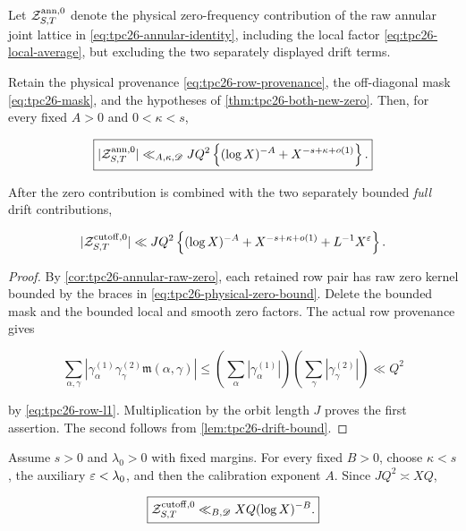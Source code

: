 Let \(\mathcal Z^{\rm ann,0}_{S,T}\) denote the physical zero-frequency
contribution of the raw annular joint lattice in
\eqref{eq:tpc26-annular-identity}, including the local factor
\eqref{eq:tpc26-local-average}, but excluding the two separately
displayed drift terms.

\begin{theorem}
\label{thm:tpc26-physical-zero}
Retain the physical provenance
\eqref{eq:tpc26-row-provenance}, the off-diagonal mask
\eqref{eq:tpc26-mask}, and the hypotheses of
\cref{thm:tpc26-both-new-zero}.  Then, for every fixed \(A>0\) and
\(0<\kappa<s\),

\begin{equation}
 \boxed{
 |\mathcal Z^{\rm ann,0}_{S,T}|
 \ll_{A,\kappa,\mathscr D}
 JQ^2\left\{
 (\log X)^{-A}+X^{-s+\kappa+o(1)}
 \right\}.}
 \label{eq:tpc26-physical-zero-bound}
\end{equation}

After the zero contribution is combined with the two separately
bounded \emph{full} drift contributions,

\begin{equation}
 |\mathcal Z^{\rm cutoff,0}_{S,T}|
 \ll
 JQ^2\left\{
 (\log X)^{-A}+X^{-s+\kappa+o(1)}
 +L^{-1}X^\varepsilon
 \right\}.
 \label{eq:tpc26-full-zero-bound}
\end{equation}
\end{theorem}

\begin{proof}
By \cref{cor:tpc26-annular-raw-zero}, each retained row pair has raw
zero kernel bounded by the braces in
\eqref{eq:tpc26-physical-zero-bound}.  Delete the bounded mask and the
bounded local and smooth zero factors.  The actual row provenance gives

\[
 \sum_{\alpha,\gamma}
 |\gamma_\alpha^{(1)}\gamma_\gamma^{(2)}
 \mathfrak m(\alpha,\gamma)|
 \le
 \left(\sum_\alpha|\gamma_\alpha^{(1)}|\right)
 \left(\sum_\gamma|\gamma_\gamma^{(2)}|\right)
 \ll Q^2
\]

by \eqref{eq:tpc26-row-l1}.  Multiplication by the orbit length \(J\)
proves the first assertion.  The second follows from
\cref{lem:tpc26-drift-bound}.
\end{proof}

\begin{corollary}
\label{cor:tpc26-zero-log-saving}
Assume \(s>0\) and \(\lambda_0>0\) with fixed margins.  For every fixed
\(B>0\), choose \(\kappa<s\), the auxiliary \(\varepsilon<\lambda_0\), and
then the calibration exponent \(A\).  Since \(JQ^2\asymp XQ\),

\begin{equation}
 \boxed{
 \mathcal Z^{\rm cutoff,0}_{S,T}
 \ll_{B,\mathscr D}XQ(\log X)^{-B}.}
 \label{eq:tpc26-zero-log-saving}
\end{equation}
\end{corollary}

